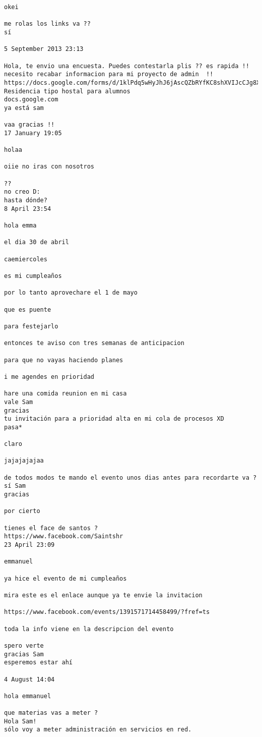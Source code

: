 \begin{verbatim}
okei

me rolas los links va ??
sí 

5 September 2013 23:13

Hola, te envio una encuesta. Puedes contestarla plis ?? es rapida !! necesito recabar informacion para mi proyecto de admin  !! 
https://docs.google.com/forms/d/1klPdq5wHyJhJ6jAscQZbRYfKC8shXVIJcCJg8XlryUU/viewform
Residencia tipo hostal para alumnos
docs.google.com
ya está sam 

vaa gracias !!
17 January 19:05

holaa

oiie no iras con nosotros

??
no creo D:
hasta dónde?
8 April 23:54

hola emma

el dia 30 de abril

caemiercoles

es mi cumpleaños

por lo tanto aprovechare el 1 de mayo

que es puente

para festejarlo

entonces te aviso con tres semanas de anticipacion

para que no vayas haciendo planes

i me agendes en prioridad 

hare una comida reunion en mi casa 
vale Sam
gracias 
tu invitación para a prioridad alta en mi cola de procesos XD
pasa*

claro

jajajajajaa

de todos modos te mando el evento unos dias antes para recordarte va ?
sí Sam 
gracias

por cierto

tienes el face de santos ?
https://www.facebook.com/Saintshr
23 April 23:09

emmanuel

ya hice el evento de mi cumpleaños

mira este es el enlace aunque ya te envie la invitacion

https://www.facebook.com/events/1391571714458499/?fref=ts

toda la info viene en la descripcion del evento 

spero verte 
gracias Sam 
esperemos estar ahí

4 August 14:04

hola emmanuel

que materias vas a meter ?
Hola Sam!
sólo voy a meter administración en servicios en red.


\end{verbatim}
